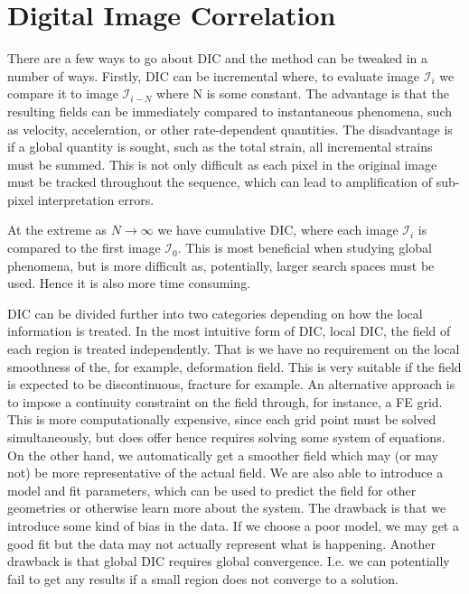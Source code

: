 \chapter{Digital Image Correlation}

There are a few ways to go about DIC and the method can be tweaked in a number of ways. Firstly, DIC can be incremental where, to evaluate image $\mathcal{I}_i$  we compare it to image $\mathcal{I}_{i-N}$  where N is some constant. The advantage is that the resulting fields can be immediately compared to instantaneous phenomena, such as velocity, acceleration, or other rate-dependent quantities. The disadvantage is if a global quantity is sought, such as the total strain, all incremental strains must be summed. This is not only difficult as each pixel in the original image must be tracked throughout the sequence,  which can lead to amplification of sub-pixel interpretation errors.

At the extreme as $N\rightarrow\infty$ we have cumulative DIC, where each image $\mathcal{I}_i$ is compared to the first image $\mathcal{I}_0$. This is most beneficial when studying global phenomena, but is more difficult as, potentially, larger search spaces must be used. Hence it is also more time consuming. 

DIC can be divided further into two categories depending on how the local information is treated. In the most intuitive form of DIC, local DIC, the field of each region is treated independently. That is we have no requirement on the local smoothness of the, for example, deformation field. This is very suitable if the field is expected to be discontinuous, fracture for example. An alternative approach is to impose a continuity constraint on the field through, for instance, a FE grid. This is more computationally expensive, since each grid point must be solved simultaneously, but does offer hence requires solving some system of equations. On the other hand, we automatically get a smoother field which may (or may not) be more representative of the actual field. We are also able to introduce a model and fit parameters, which can be used to predict the field for other geometries or otherwise learn more about the system. The drawback is that we introduce some kind of bias in the data. If we choose a poor model, we may get a good fit but the data may not actually represent what is happening. Another drawback is that global DIC requires global convergence. I.e. we can potentially fail to get any results if a small region does not converge to a solution.


